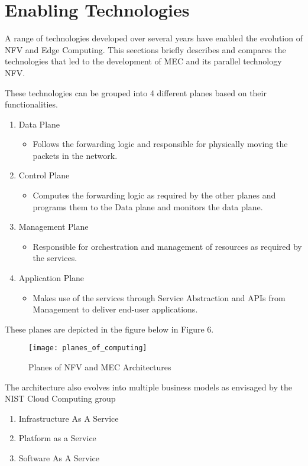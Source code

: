 \section{Enabling Technologies}

A range of technologies developed over several years have enabled the evolution of NFV and Edge Computing. This seections briefly describes and compares the technologies that led to the development of MEC and its parallel technology NFV.

These technologies can be grouped into 4 different planes based on their functionalities.

\begin{enumerate}
    \item Data Plane
	\begin{itemize}
	    \item Follows the forwarding logic and responsible for physically moving the packets in the network.
        \end{itemize}
    \item Control Plane
	\begin{itemize}
	    \item Computes the forwarding logic as required by the other planes and programs them to the Data plane and monitors the data plane.
        \end{itemize}
    \item Management Plane
	\begin{itemize}
	    \item Responsible for orchestration and management of resources as required by the services.
	\end{itemize}
    \item Application Plane
	\begin{itemize}
	    \item Makes use of the services through Service Abstraction and APIs from Management to deliver end-user applications.
	\end{itemize}
\end{enumerate}

These planes are depicted in the figure below in Figure 6.

\begin{figure}
	\centering
        \texttt{[image: planes\_of\_computing]}
	\label{fig:figure6}
	\caption{Planes of NFV and MEC Architectures}
\end{figure}

The architecture also evolves into multiple business models as envisaged by the NIST Cloud Computing group

\begin{enumerate}
    \item Infrastructure As A Service
    \item Platform as a Service
    \item Software As A Service
\end{enumerate}
